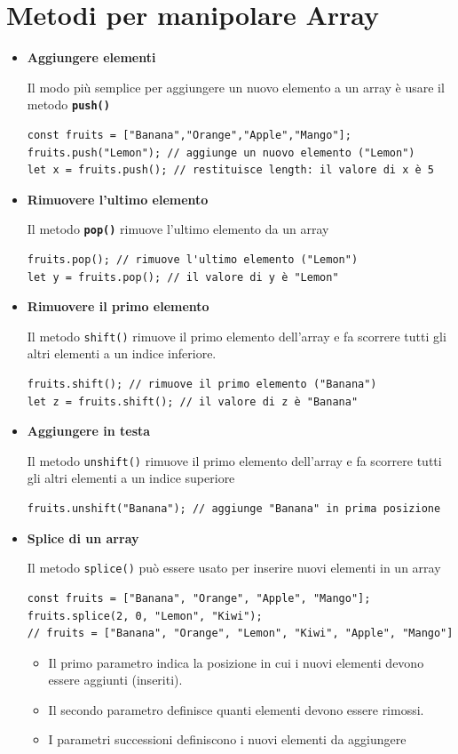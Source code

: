 \newpage
\section{Metodi per manipolare Array}
\begin{itemize}
    \item \textbf{Aggiungere elementi}

    Il modo più semplice per aggiungere un nuovo elemento a un array è usare il metodo \textbf{\texttt{push()}}
    \begin{lstlisting}
const fruits = ["Banana","Orange","Apple","Mango"];
fruits.push("Lemon"); // aggiunge un nuovo elemento ("Lemon")
let x = fruits.push(); // restituisce length: il valore di x è 5
    \end{lstlisting}

    \item \textbf{Rimuovere l'ultimo elemento}

    Il metodo \textbf{\texttt{pop()}} rimuove l'ultimo elemento da un array
    \begin{lstlisting}
fruits.pop(); // rimuove l'ultimo elemento ("Lemon")
let y = fruits.pop(); // il valore di y è "Lemon"
    \end{lstlisting}

    \item \textbf{Rimuovere il primo elemento}
    
    Il metodo \texttt{shift()} rimuove il primo elemento dell'array e fa scorrere tutti gli altri elementi a un indice inferiore.
    \begin{lstlisting}
fruits.shift(); // rimuove il primo elemento ("Banana")
let z = fruits.shift(); // il valore di z è "Banana"
    \end{lstlisting}
    \item \textbf{Aggiungere in testa}
    
    Il metodo \texttt{unshift()} rimuove il primo elemento dell'array e fa scorrere tutti gli altri elementi a un indice superiore
    \begin{lstlisting}
fruits.unshift("Banana"); // aggiunge "Banana" in prima posizione
    \end{lstlisting}
    \item \textbf{Splice di un array}

    Il metodo \texttt{splice()} può essere usato per inserire nuovi elementi in un array
    \begin{lstlisting}
const fruits = ["Banana", "Orange", "Apple", "Mango"];
fruits.splice(2, 0, "Lemon", "Kiwi");
// fruits = ["Banana", "Orange", "Lemon", "Kiwi", "Apple", "Mango"]
    \end{lstlisting}
    \begin{itemize}
        \item Il primo parametro indica la posizione in cui i nuovi elementi devono essere aggiunti (inseriti).
        \item Il secondo parametro definisce quanti elementi devono essere rimossi.
        \item I parametri successioni definiscono i nuovi elementi da aggiungere
    \end{itemize}


\end{itemize}
